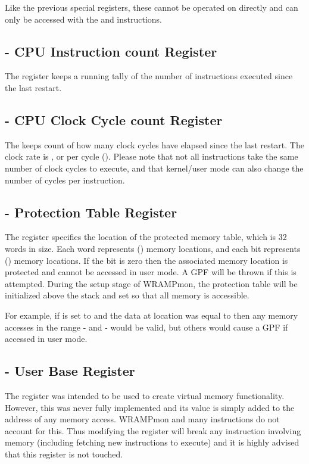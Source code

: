 Like the previous special registers, these cannot be operated on directly 
and can only be accessed with the  and  instructions.

\subsection{ - CPU Instruction count Register}

The  register keeps a running tally of the number of instructions 
executed since the last restart.

\subsection{ - CPU Clock Cycle count Register}

The  keeps count of how many clock cycles have elapsed since the 
last restart.
The clock rate is , or  per cycle ().
Please note that not all instructions take the same number of clock cycles to 
execute, and that kernel/user mode can also change the number of cycles per instruction.

\subsection{ - Protection Table Register}
\label{sec:MPU}

The  register specifies the location of the protected memory table, 
which is 32 words in size. Each word represents  () memory
locations, and each bit represents  () memory locations.
If the bit is zero then the associated memory location is protected and cannot 
be accessed in user mode. A GPF will be thrown if this is attempted.
During the setup stage of WRAMPmon, the protection table will be initialized 
above the stack and set so that all memory is accessible.

For example, if  is set to  and the data at location 
 was equal to  then any memory accesses in the range 
- and - would be valid, but others 
would cause a GPF if accessed in user mode.

\subsection{ - User Base Register}

The  register was intended to be used to create virtual memory 
functionality.
However, this was never fully implemented and its value is simply added to the
address of any memory access. WRAMPmon and many instructions do not account
for this. Thus modifying the  register will break any instruction 
involving memory (including fetching new instructions to execute) and it is 
highly advised that this register is not touched.


